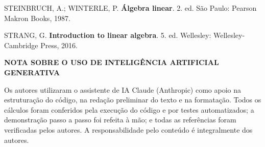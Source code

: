 \documentclass[12pt,a4paper]{article}
\begin{document}
\begin{singlespace}
\begin{flushleft}
\vspace{6pt}
\noindent STEINBRUCH, A.; WINTERLE, P. \textbf{Álgebra linear}. 2. ed. São Paulo: Pearson Makron Books, 1987.

\vspace{6pt}
\noindent STRANG, G. \textbf{Introduction to linear algebra}. 5. ed. Wellesley: Wellesley-Cambridge Press, 2016.
\end{flushleft}

\vspace{8pt}
\noindent\textbf{NOTA SOBRE O USO DE INTELIGÊNCIA ARTIFICIAL GENERATIVA}\par\vspace{3pt}
\noindent Os autores utilizaram o assistente de IA Claude (Anthropic) como apoio na estruturação do código, na redação preliminar do texto e na formatação. Todos os cálculos foram conferidos pela execução do código e por testes automatizados; a demonstração passo a passo foi refeita à mão; e todas as referências foram verificadas pelos autores. A responsabilidade pelo conteúdo é integralmente dos autores.
\end{singlespace}
\end{document}
